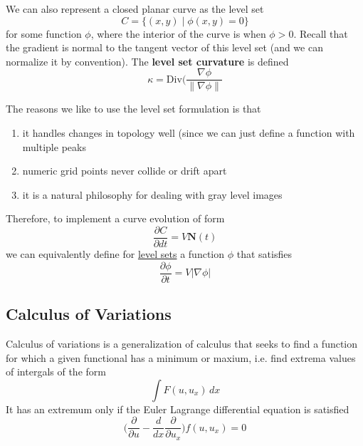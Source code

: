 \documentclass{article}
\begin{document}
    \begin{definition}
      \label{def:level-sets}
    We can also represent a closed planar curve as the level set 
    \begin{equation}
      C = \{(x, y) \mid \phi(x, y) = 0\}
    \end{equation}
    for some function $\phi$, where the interior of the curve is when $\phi > 0$. Recall that the gradient is normal to the tangent vector of this level set (and we can normalize it by convention). The \textbf{level set curvature} is defined 
    \begin{equation}
      \kappa = \mathrm{Div} \bigg( \frac{\nabla \phi}{\|\nabla \phi\|}
    \end{equation}
    \end{definition}

    The reasons we like to use the level set formulation is that 
    \begin{enumerate}
        \item it handles changes in topology well (since we can just define a function with multiple peaks 
        \item numeric grid points never collide or drift apart 
        \item it is a natural philosophy for dealing with gray level images 
    \end{enumerate}

    Therefore, to implement a curve evolution of form 
    \begin{equation}
      \frac{\partial C}{\partial dt} = V \mathbf{N}(t)
    \end{equation}
    we can equivalently define for \hyperref[def:level-sets]{level sets} a function $\phi$ that satisfies 
    \begin{equation}
      \frac{\partial \phi}{\partial t} = V |\nabla \phi|
    \end{equation}

  \subsection{Calculus of Variations}

    \begin{definition}
      \label{def:calculus-of-variations}
    Calculus of variations is a generalization of calculus that seeks to find a function for which a given functional has a minimum or maxium, i.e. find extrema values of intergals of the form 
    \begin{equation}
      \int F(u, u_x) \,dx
    \end{equation}
    It has an extremum only if the Euler Lagrange differential equation is satisfied 
    \begin{equation}
      \bigg( \frac{\partial}{\partial u} - \frac{d}{dx} \frac{\partial}{\partial u_x} \bigg) f(u, u_x) = 0
    \end{equation}
    \end{definition}
\end{document}
